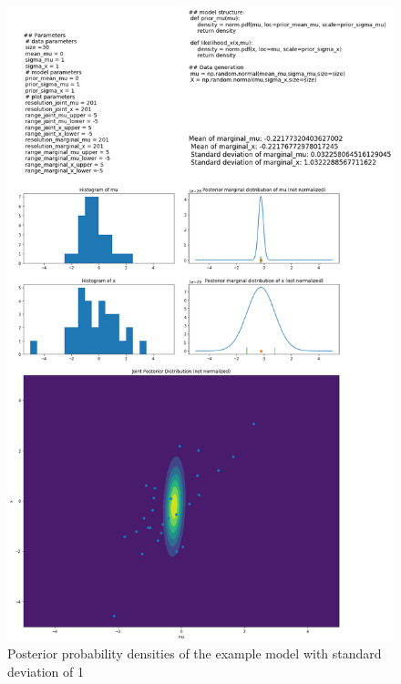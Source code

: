 \documentclass{article}
\begin{document}
\begin{figure}
	\includegraphics[width=\textwidth]{images/ground_truth_posterior_3.png}
	\caption[Posterior probability densities of the example model with standard deviation of 1]{Posterior probability densities of the example model with standard deviation of 1}
	\label{fig:ground_truth_posterior_3}
\end{figure}
\end{document}
